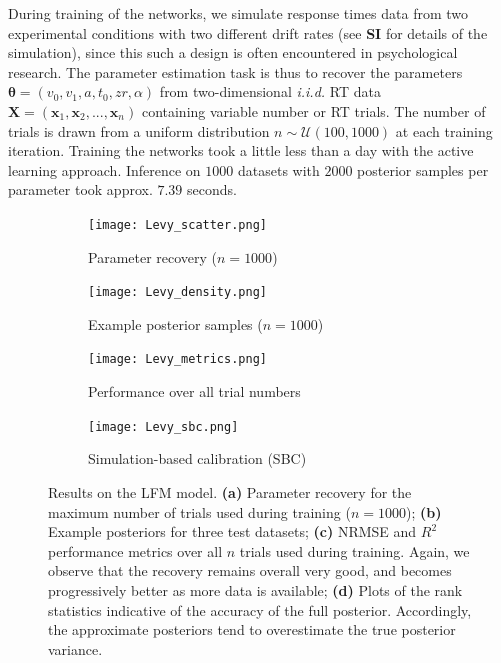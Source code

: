 \documentclass[9pt,twoside,lineno]{pnas-new}
\begin{document}
During training of the networks, we simulate response times data from two experimental conditions with two different drift rates (see \textbf{SI} for details of the simulation), since this such a design is often encountered in psychological research. The parameter estimation task is thus to recover the parameters $\boldsymbol{\theta} = (v_{0}, v_{1}, a, t_{0}, zr, \alpha)$ from two-dimensional \textit{i.i.d.} RT data $\boldsymbol{X} = (\boldsymbol{x}_{1},\boldsymbol{x}_{2},...,\boldsymbol{x}_{n})$ containing variable number or RT trials. The number of trials is drawn from a uniform distribution $n \sim \mathcal{U}(100, 1000)$ at each training iteration. Training the networks took a little less than a day with the active learning approach. Inference on $1000$ datasets with $2000$ posterior samples per parameter took approx. $7.39$ seconds. 

\begin{figure}[H]
\centering
\begin{subfigure}{.49\textwidth}
    \centering
    \texttt{[image: Levy\_scatter.png]}
    \caption{Parameter recovery ($n=1000$)}
    \label{fig:Fig.5a}
\end{subfigure}
\begin{subfigure}{.49\textwidth}
    \centering
    \texttt{[image: Levy\_density.png]}
    \caption{Example posterior samples ($n=1000$)}
    \label{fig:Fig.5b}
\end{subfigure}
\begin{subfigure}{.49\textwidth}
    \centering
    \texttt{[image: Levy\_metrics.png]}
    \caption{Performance over all trial numbers}
    \label{fig:Fig.5c}
\end{subfigure}
\begin{subfigure}{.49\textwidth}
    \centering
    \texttt{[image: Levy\_sbc.png]}
    \caption{Simulation-based calibration (SBC)}
    \label{fig:Fig.5d}
\end{subfigure}
\caption[short]{Results on the LFM model. \textbf{(a)} Parameter recovery for the maximum number of trials used during training ($n=1000$); \textbf{(b)} Example posteriors for three test datasets; \textbf{(c)} NRMSE and $R^{2}$ performance metrics over all $n$ trials used during training. Again, we observe that the recovery remains overall very good, and becomes progressively better as more data is available; \textbf{(d)} Plots of the rank statistics indicative of the accuracy of the full posterior. Accordingly, the approximate posteriors tend to overestimate the true posterior variance.} \label{fig:Fig.5}
\end{figure}
\end{document}
